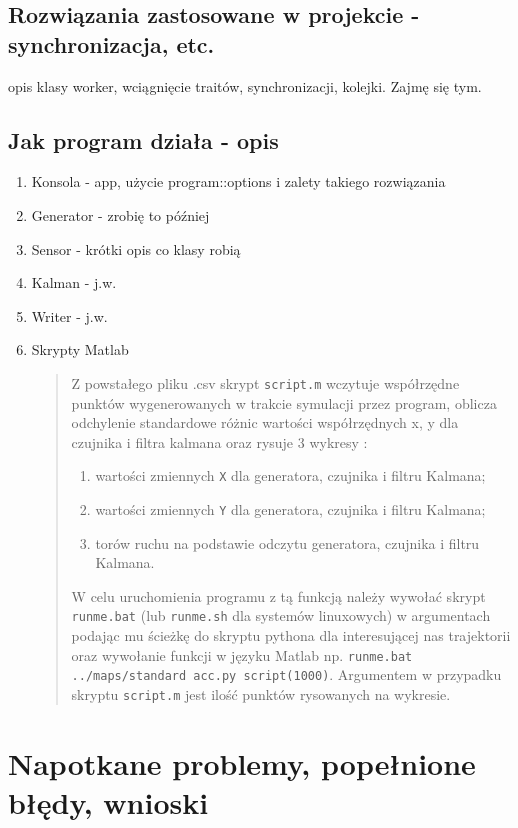 \documentclass{article}
\begin{document}
	\subsection{Rozwiązania zastosowane w projekcie - synchronizacja, etc.}
		opis klasy worker, wciągnięcie traitów, synchronizacji, kolejki. Zajmę się tym.
	\subsection{Jak program działa - opis}
	\begin{enumerate}
		\item Konsola - app, użycie program::options i zalety takiego rozwiązania
		\item Generator - zrobię to później
		\item Sensor - krótki opis co klasy robią
		\item Kalman - j.w.
		\item Writer - j.w.
		\item Skrypty Matlab 
		\begin{verse}
		Z powstałego pliku .csv skrypt \texttt{script.m} wczytuje współrzędne
		punktów wygenerowanych w trakcie symulacji przez program,
		oblicza odchylenie standardowe różnic wartości współrzędnych
		x, y dla czujnika i filtra kalmana oraz rysuje 3 wykresy : 
		\begin{enumerate}
			\item wartości zmiennych \texttt{X} dla generatora, czujnika i filtru Kalmana;
			\item wartości zmiennych \texttt{Y} dla generatora, czujnika i filtru Kalmana;
			\item torów ruchu na podstawie odczytu generatora, czujnika i filtru Kalmana.
		\end{enumerate}
		W celu uruchomienia programu z tą funkcją należy wywołać skrypt \texttt{runme.bat} (lub \texttt{runme.sh} dla systemów linuxowych) w argumentach podając mu ścieżkę do skryptu pythona dla interesującej nas trajektorii oraz wywołanie funkcji w języku Matlab np. \texttt{runme.bat ../maps/standard acc.py script(1000)}. Argumentem w przypadku skryptu \texttt{script.m} jest ilość punktów rysowanych na wykresie.
		\end{verse}
	\end{enumerate}
	
	\section{Napotkane problemy, popełnione błędy, wnioski}
	
\end{document}
